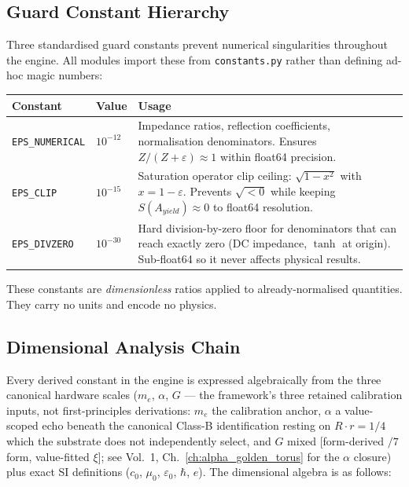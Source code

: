 \subsection{Guard Constant Hierarchy}
Three standardised guard constants prevent numerical singularities throughout the engine.  All modules import these from \texttt{constants.py} rather than defining ad-hoc magic numbers:

\begin{center}
\small
\renewcommand{\arraystretch}{1.3}
\begin{tabular}{llp{7.2cm}}
\toprule
\textbf{Constant} & \textbf{Value} & \textbf{Usage} \\
\midrule
\texttt{EPS\_NUMERICAL} & $10^{-12}$ & Impedance ratios, reflection coefficients, normalisation denominators.  Ensures $Z/(Z + \varepsilon) \approx 1$ within float64 precision. \\
\texttt{EPS\_CLIP} & $10^{-15}$ & Saturation operator clip ceiling: $\sqrt{1 - x^2}$ with $x = 1 - \varepsilon$.  Prevents $\sqrt{<0}$ while keeping $S(A_{yield}) \approx 0$ to float64 resolution. \\
\texttt{EPS\_DIVZERO} & $10^{-30}$ & Hard division-by-zero floor for denominators that can reach exactly zero (DC impedance, $\tanh$ at origin).  Sub-float64 so it never affects physical results. \\
\bottomrule
\end{tabular}
\end{center}

These constants are \emph{dimensionless} ratios applied to already-normalised quantities.  They carry no units and encode no physics.

\subsection{Dimensional Analysis Chain}
Every derived constant in the engine is expressed algebraically from the three canonical hardware scales ($m_e$, $\alpha$, $G$ --- the framework's three retained calibration inputs, not first-principles derivations: $m_e$ the calibration anchor, $\alpha$ a value-scoped echo beneath the canonical Class-B identification resting on $R\cdot r = 1/4$ which the substrate does not independently select, and $G$ mixed [form-derived $/7$ form, value-fitted $\xi$]; see Vol.~1, Ch.~\ref{ch:alpha_golden_torus} for the $\alpha$ closure) plus exact SI definitions ($c_0$, $\mu_0$, $\varepsilon_0$, $\hbar$, $e$).  The dimensional algebra is as follows:


